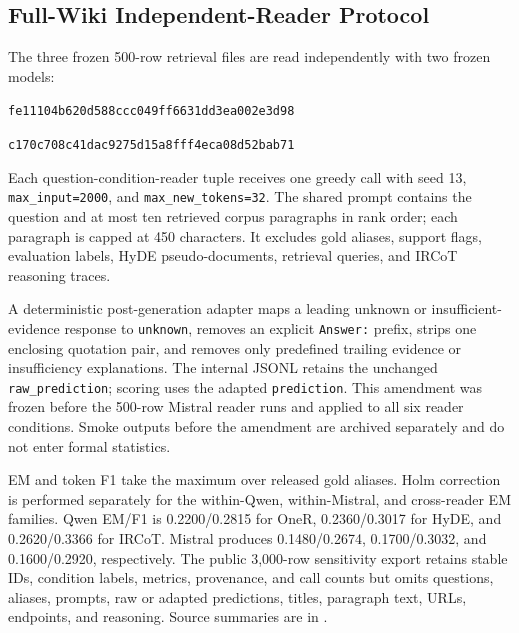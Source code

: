 \documentclass[pdflatex,sn-basic,Numbered]{sn-jnl}
\begin{document}




\subsection{Full-Wiki Independent-Reader Protocol}

The three frozen 500-row retrieval files are read independently with two frozen
models:
\begin{center}
\small{}\par
{\scriptsize\texttt{fe11104b620d588ccc049ff6631dd3ea002e3d98}}\par\medskip
\small{}\par
{\scriptsize\texttt{c170c708c41dac9275d15a8fff4eca08d52bab71}}
\end{center}
Each question-condition-reader tuple receives one greedy call with seed 13,
\texttt{max\_input=2000}, and \texttt{max\_new\_tokens=32}. The shared prompt
contains the question and at most ten retrieved corpus paragraphs in rank order;
each paragraph is capped at 450 characters. It excludes gold aliases, support
flags, evaluation labels, HyDE pseudo-documents, retrieval queries, and IRCoT
reasoning traces.

A deterministic post-generation adapter maps a leading unknown or
insufficient-evidence response to \texttt{unknown}, removes an explicit
\texttt{Answer:} prefix, strips one enclosing quotation pair, and removes only
predefined trailing evidence or insufficiency explanations. The internal JSONL
retains the unchanged \texttt{raw\_prediction}; scoring uses the adapted
\texttt{prediction}. This amendment was frozen before the 500-row Mistral reader
runs and applied to all six reader conditions. Smoke outputs before the amendment
are archived separately and do not enter formal statistics.

EM and token F1 take the maximum over released gold aliases. Holm correction is
performed separately for the within-Qwen, within-Mistral, and cross-reader EM
families. Qwen EM/F1 is 0.2200/0.2815 for OneR, 0.2360/0.3017 for HyDE, and
0.2620/0.3366 for IRCoT. Mistral produces 0.1480/0.2674, 0.1700/0.3032, and
0.1600/0.2920, respectively. The public 3,000-row sensitivity export retains
stable IDs, condition labels, metrics, provenance, and call counts but omits
questions, aliases, prompts, raw or adapted predictions, titles, paragraph text,
URLs, endpoints, and reasoning. Source summaries are in
.
\end{document}
